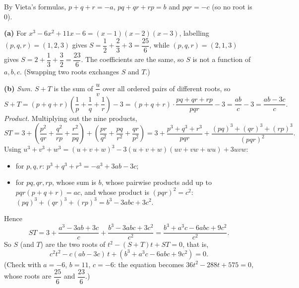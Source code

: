 By Vieta's formulas, $p+q+r=-a$, $pq+qr+rp=b$ and $pqr=-c$ (so no root is $0$).

\textbf{(a)} For $x^3-6x^2+11x-6=(x-1)(x-2)(x-3)$, labelling $(p,q,r)=(1,2,3)$ gives $S=\dfrac12+\dfrac23+3=\dfrac{25}{6}$, while $(p,q,r)=(2,1,3)$ gives $S=2+\dfrac13+\dfrac32=\dfrac{23}{6}$. The coefficients are the same, so $S$ is not a function of $a,b,c$. (Swapping two roots exchanges $S$ and $T$.)

\textbf{(b)} \emph{Sum.} $S+T$ is the sum of $\dfrac uv$ over all ordered pairs of different roots, so
\[S+T=(p+q+r)\left(\dfrac1p+\dfrac1q+\dfrac1r\right)-3=(p+q+r)\cdot\dfrac{pq+qr+rp}{pqr}-3=\dfrac{ab}{c}-3=\dfrac{ab-3c}{c}.\]
\emph{Product.} Multiplying out the nine products,
\[ST=3+\left(\dfrac{p^2}{qr}+\dfrac{q^2}{rp}+\dfrac{r^2}{pq}\right)+\left(\dfrac{pr}{q^2}+\dfrac{pq}{r^2}+\dfrac{qr}{p^2}\right)=3+\dfrac{p^3+q^3+r^3}{pqr}+\dfrac{(pq)^3+(qr)^3+(rp)^3}{(pqr)^2}.\]
Using $u^3+v^3+w^3=(u+v+w)^3-3(u+v+w)(uv+vw+wu)+3uvw$:
\begin{itemize}
\item for $p,q,r$: $p^3+q^3+r^3=-a^3+3ab-3c$;
\item for $pq,qr,rp$, whose sum is $b$, whose pairwise products add up to $pqr(p+q+r)=ac$, and whose product is $(pqr)^2=c^2$: $(pq)^3+(qr)^3+(rp)^3=b^3-3abc+3c^2$.
\end{itemize}
Hence
\[ST=3+\dfrac{a^3-3ab+3c}{c}+\dfrac{b^3-3abc+3c^2}{c^2}=\dfrac{b^3+a^3c-6abc+9c^2}{c^2}.\]
So $S$ (and $T$) are the two roots of $t^2-(S+T)t+ST=0$, that is,
\[\boxed{c^2t^2-c(ab-3c)\,t+\left(b^3+a^3c-6abc+9c^2\right)=0.}\]
(Check with $a=-6$, $b=11$, $c=-6$: the equation becomes $36t^2-288t+575=0$, whose roots are $\dfrac{25}{6}$ and $\dfrac{23}{6}$.)
